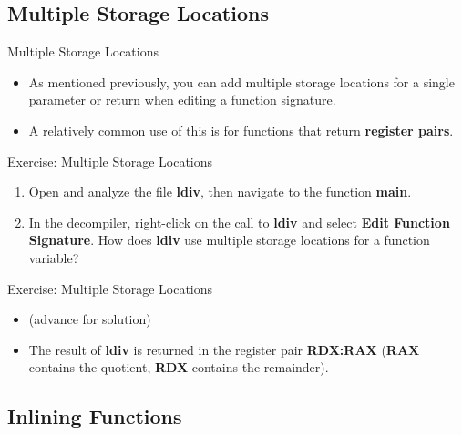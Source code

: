 \documentclass{beamer}
\begin{document}
\subsection{Multiple Storage Locations}
\begin{frame}
\begin{block}{Multiple Storage Locations}
\begin{itemize}
\item As mentioned previously, you can add multiple storage locations for a single parameter or return when editing a function signature.
\item A relatively common use of this is for functions that return \textbf{register pairs}.
\end{itemize}
\end{block}
\end{frame}

\begin{frame}
\begin{block}{Exercise: Multiple Storage Locations}
\begin{enumerate}
\item Open and analyze the file \textbf{ldiv}, then navigate to the function \textbf{main}.
\item In the decompiler, right-click on the call to \textbf{ldiv} and select \textbf{Edit Function Signature}.  How does \textbf{ldiv} use multiple storage locations for a function variable?
\end{enumerate}
\end{block}
\end{frame}

\begin{frame}
\begin{block}{Exercise: Multiple Storage Locations}
\begin{itemize}
\item[] (advance for solution)
\pause
\item The result of \textbf{ldiv} is returned in the register pair \textbf{RDX:RAX} (\textbf{RAX} contains the quotient, \textbf{RDX} contains the remainder). 
\end{itemize}
\end{block}
\end{frame}

\subsection{Inlining Functions}
\end{document}
